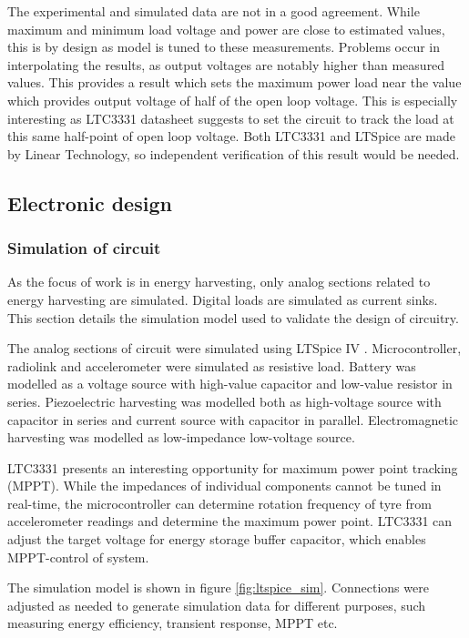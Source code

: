 The experimental and simulated data are not in a good agreement. While maximum and minimum load voltage and power are close to estimated values, this is by design as model is tuned to these measurements. Problems occur in interpolating the results, as output voltages are notably higher than measured values. This provides a result which sets the maximum power load near the value which provides output voltage of half of the open loop voltage. This is especially interesting as LTC3331 datasheet \cite{LTC3331} suggests to set the circuit to track the load at this same half-point of open loop voltage. Both LTC3331 and LTSpice are made by Linear Technology, so independent verification of this result would be needed. 

\subsection{Electronic design} \label{sect:electronic_design}
\subsubsection{Simulation of circuit}
As the focus of work is in energy harvesting, only analog sections related to energy harvesting are simulated. Digital loads are simulated as current sinks. This section details the simulation model used to validate the design of circuitry.

The analog sections of circuit were simulated using LTSpice IV \cite{ltspice}. Microcontroller, radiolink and accelerometer were simulated as resistive load. Battery was modelled as a voltage source with high-value capacitor and low-value resistor in series. Piezoelectric harvesting was modelled both as high-voltage source with capacitor in series and current source with capacitor in parallel. Electromagnetic harvesting was modelled as low-impedance low-voltage source. 

LTC3331 presents an interesting opportunity for maximum power point tracking (MPPT). While the impedances of individual components cannot be tuned in real-time, the microcontroller can determine rotation frequency of tyre from accelerometer readings and determine the maximum power point. LTC3331 can adjust the target voltage for energy storage buffer capacitor, which enables MPPT-control of system.

The simulation model is shown in figure \ref{fig:ltspice_sim}. Connections were adjusted as needed to generate simulation data for different purposes, such measuring energy efficiency, transient response, MPPT etc.

